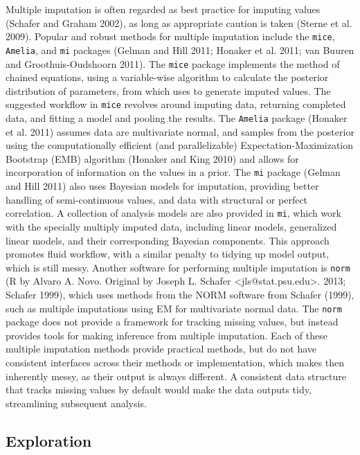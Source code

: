 \documentclass[]{article}
\theoremstyle{definition}
\theoremstyle{definition}
\theoremstyle{definition}
\theoremstyle{remark}
\begin{document}
Multiple imputation is often regarded as best practice for imputing
values (Schafer and Graham 2002), as long as appropriate caution is
taken (Sterne et al. 2009). Popular and robust methods for multiple
imputation include the \texttt{mice}, \texttt{Amelia}, and \texttt{mi}
packages (Gelman and Hill 2011; Honaker et al. 2011; van Buuren and
Groothuis-Oudshoorn 2011). The \texttt{mice} package implements the
method of chained equations, using a variable-wise algorithm to
calculate the posterior distribution of parameters, from which uses to
generate imputed values. The suggested workflow in \texttt{mice}
revolves around imputing data, returning completed data, and fitting a
model and pooling the results. The \texttt{Amelia} package (Honaker et
al. 2011) assumes data are multivariate normal, and samples from the
posterior using the computationally efficient (and parallelizable)
Expectation-Maximization Bootstrap (EMB) algorithm (Honaker and King
2010) and allows for incorporation of information on the values in a
prior. The \texttt{mi} package (Gelman and Hill 2011) also uses Bayesian
models for imputation, providing better handling of semi-continuous
values, and data with structural or perfect correlation. A collection of
analysis models are also provided in \texttt{mi}, which work with the
specially multiply imputed data, including linear models, generalized
linear models, and their corresponding Bayesian components. This
approach promotes fluid workflow, with a similar penalty to tidying up
model output, which is still messy. Another software for performing
multiple imputation is \texttt{norm} (R by Alvaro A. Novo. Original by
Joseph L. Schafer \textless{}jls@stat.psu.edu\textgreater{}. 2013;
Schafer 1999), which uses methods from the NORM software from Schafer
(1999), such as multiple imputations using EM for multivariate normal
data. The \texttt{norm} package does not provide a framework for
tracking missing values, but instead provides tools for making inference
from multiple imputation. Each of these multiple imputation methods
provide practical methods, but do not have consistent interfaces across
their methods or implementation, which makes then inherently messy, as
their output is always different. A consistent data structure that
tracks missing values by default would make the data outputs tidy,
streamlining subsequent analysis.

\hypertarget{exploration}{%
\subsection{Exploration}\label{exploration}}
\end{document}
